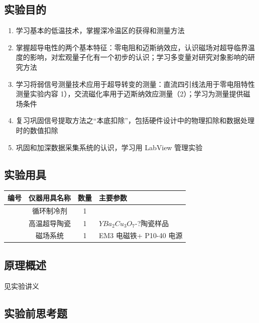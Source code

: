 \documentclass{ctexart}
\theoremstyle{ansstyle}
\newcounter{instruCounter}
\newcommand{\instrument}[3]{%
	\stepcounter{instruCounter}\theinstruCounter &%
	#1 &%
	#2 &%
	#3 \\
	\hline
}
\begin{document}
\subsection{实验目的}

\begin{enumerate}
    \item 学习基本的低温技术，掌握深冷温区的获得和测量方法
    \item 掌握超导电性的两个基本特征：零电阻和迈斯纳效应，认识磁场对超导临界温度的影响，对宏观量子化有一个初步的认识；学习多变量对研究对象影响的研究方法
    \item 学习将弱信号测量技术应用于超导转变的测量：直流四引线法用于零电阻特性测量实验内容 1），交流磁化率用于迈斯纳效应测量（2）；学习为测量提供磁场条件
    \item 复习巩固信号提取方法之“本底扣除”，包括硬件设计中的物理扣除和数据处理时的数值扣除
    \item 巩固和加深数据采集系统的认识，学习用 LabView 管理实验
\end{enumerate}

\subsection{实验用具}
\begin{table}[H]
    \begin{center}
        \begin{tabular}{|c|c|c|m{12cm}|}
            \hline
            编号 & 仪器用具名称 & 数量 & 主要参数 \\
            \hline
            \instrument{循环制冷剂}{1}{} %
            \instrument{高温超导陶瓷}{1}{$YBa_2Cu_3O_7$-?陶瓷样品}
            \instrument{磁场系统}{1}{EM3 电磁铁+ P10-40 电源}
        \end{tabular}
    \end{center}
\end{table}



\subsection{原理概述}
见实验讲义

\subsection{实验前思考题}
\end{document}
